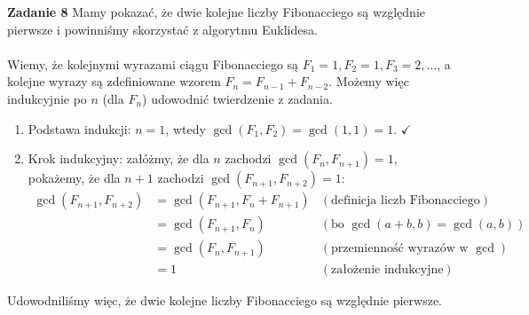 \documentclass[a4paper,12pt]{article}
\begin{document}
\noindent \newline \textbf{Zadanie 8} \newline
Mamy pokazać, że dwie kolejne liczby Fibonacciego są względnie pierwsze i powinniśmy skorzystać z algorytmu Euklidesa. \\ \\
Wiemy, że kolejnymi wyrazami ciągu Fibonacciego są $F_1 = 1, F_2 = 1, F_3 = 2, \dots$, a kolejne wyrazy są zdefiniowane wzorem $F_{n} = F_{n-1} + F_{n-2}$. Możemy więc indukcyjnie po $n$ (dla $F_n$) udowodnić twierdzenie z zadania.
\begin{enumerate}
\item Podstawa indukcji: $n = 1$, wtedy $\gcd(F_1, F_2) = \gcd(1, 1) = 1$. $\checkmark$ 
\item Krok indukcyjny: załóżmy, że dla $n$ zachodzi $\gcd(F_n, F_{n+1}) = 1$, pokażemy, że dla $n+1$ zachodzi $\gcd(F_{n+1}, F_{n+2}) = 1$:
$$
\begin{aligned}
\gcd(F_{n+1}, F_{n+2})	&= \gcd(F_{n+1}, F_{n} + F_{n+1}) 	&\left(\text{definicja liczb Fibonacciego}\right) \\
					&= \gcd(F_{n+1}, F_{n})		  	&\left(\text{bo } \gcd(a+b, b) = \gcd(a, b)\right) \\
					&= \gcd(F_{n}, F_{n+1})			&\left(\text{przemienność wyrazów w $\gcd$}\right) \\
					&= 1							&\left(\text{założenie indukcyjne}\right)
\end{aligned}
$$
\end{enumerate}
Udowodniliśmy więc, że dwie kolejne liczby Fibonacciego są względnie pierwsze.
\end{document}

